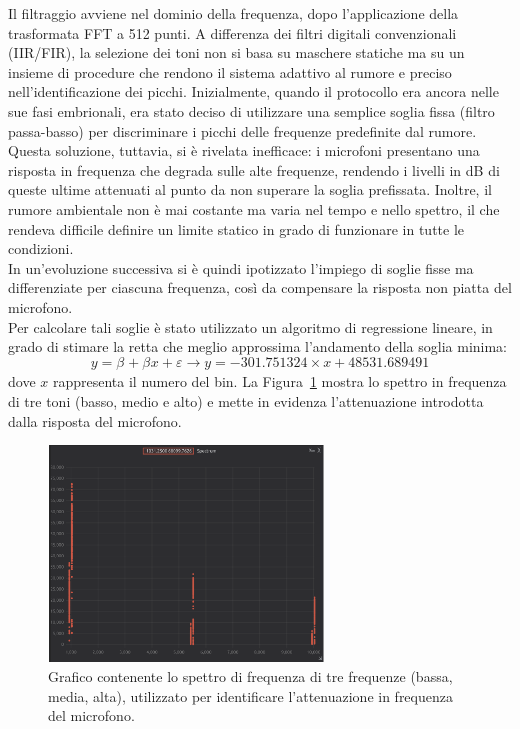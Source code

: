 Il filtraggio avviene nel dominio della frequenza, dopo l’applicazione della trasformata FFT a 512 punti.
 A differenza dei filtri digitali convenzionali (IIR/FIR), la selezione dei toni non si basa su maschere statiche ma su un insieme di procedure che rendono il sistema adattivo al rumore e preciso nell’identificazione dei picchi. 
 Inizialmente, quando il protocollo era ancora nelle sue fasi embrionali, era stato deciso di utilizzare una semplice soglia fissa (filtro passa-basso) per discriminare i picchi delle frequenze predefinite dal rumore. 
 Questa soluzione, tuttavia, si è rivelata inefficace: i microfoni presentano una risposta in frequenza che degrada sulle alte frequenze, rendendo i livelli in dB di queste ultime attenuati al punto da non superare la soglia prefissata. 
 Inoltre, il rumore ambientale non è mai costante ma varia nel tempo e nello spettro, il che rendeva difficile definire un limite statico in grado di funzionare in tutte le condizioni.\\

In un’evoluzione successiva si è quindi ipotizzato l’impiego di soglie fisse ma differenziate per ciascuna frequenza, così da compensare la risposta non piatta del microfono. \\
 Per calcolare tali soglie è stato utilizzato un algoritmo di regressione lineare, in grado di stimare la retta che meglio approssima l’andamento della soglia minima:
\[
y = \beta_{} + \beta_{}x + \varepsilon \rightarrow y = -301.751324 \times x + 48531.689491
\]
dove $x$ rappresenta il numero del bin. La Figura~\ref{fig:spettro2} mostra lo spettro in frequenza di tre toni (basso, medio e alto) e mette in evidenza l’attenuazione introdotta dalla risposta del microfono.
\begin{figure}[H]
    \centering
    \includegraphics[width=0.65\textwidth]{immagini/fft_regression_check.png}
    \caption{Grafico contenente lo spettro di frequenza di tre frequenze (bassa, media, alta), utilizzato per identificare l'attenuazione in frequenza del microfono.}
    \label{fig:spettro2}
\end{figure}

